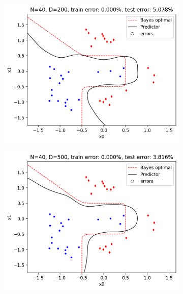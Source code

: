\documentclass[a4paper,11pt]{article}
\begin{document}
\begin{figure}[ht]
\begin{subfigure}[b]{0.3\textwidth}
        \includegraphics[width=\textwidth]{../boundary/200.png}
    \end{subfigure}
    \hfill
    \begin{subfigure}[b]{0.3\textwidth}
        \includegraphics[width=\textwidth]{../boundary/500.png}
    \end{subfigure}
    \hfill
    \begin{subfigure}[b]{0.3\textwidth}

\end{subfigure}
\end{figure}
\end{document}
